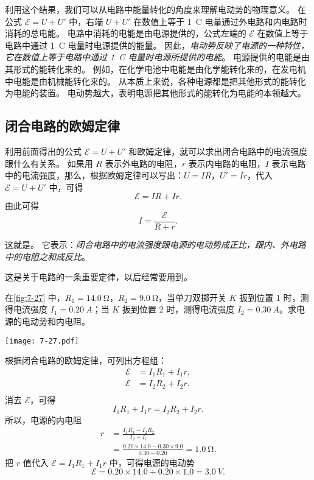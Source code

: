 利用这个结果，我们可以从电路中能量转化的角度来理解电动势的物理意义。
在公式 $\mathcal{E}=U+U'$ 中，右端 $U+U'$ 在数值上等于 \qty{1}{C} 电量通过外电路和内电路时消耗的总电能。
电路中消耗的电能是由电源提供的，公式左端的 $\mathcal{E}$ 在数值上等于电路中通过 \qty{1}{C} 电量时电源提供的能量。
因此，\emph{电动势反映了电源的一种特性，它在数值上等于电路中通过 \qty{1}{C} 电量时电源所提供的电能}。
电源提供的电能是由其形式的能转化来的。
例如，在化学电池中电能是由化学能转化来的，在发电机中电能是由机械能转化来的。
从本质上来说，各种电源都是把其他形式的能转化为电能的装置。
电动势越大，表明电源把其他形式的能转化为电能的本领越大。

\subsection{闭合电路的欧姆定律}

利用前面得出的公式 $\mathcal{E}=U+U'$ 和欧姆定律，就可以求出闭合电路中的电流强度跟什么有关系。
如果用 $R$ 表示外电路的电阻，$r$ 表示内电路的电阻，$I$ 表示电路中的电流强度，那么，根据欧姆定律可以写出：$U=IR$，$U'=Ir$，代入$\mathcal{E}=U+U'$ 中，可得
\[\mathcal{E}=IR+Ir.\]
由此可得
\[I=\frac{\mathcal{E}}{R+r}.\]

这就是。
它表示：\emph{闭合电路中的电流强度跟电源的电动势成正比，跟内、外电路中的电阻之和成反比}。

这是关于电路的一条重要定律，以后经常要用到。

\medskip\noindent
\begin{minipage}{0.55\linewidth}
\begin{example}
在\cref{fig:7-27} 中，$R_1=\qty{14.0}{\ohm}$，$R_2=\qty{9.0}{\ohm}$，当单刀双掷开关 $K$ 扳到位置 1 时，测得电流强度 $I_1=\qty{0.20}{A}$；当 $K$ 扳到位置 2 时，测得电流强度 $I_2=\qty{0.30}{A}$。求电源的电动势和内电阻。
\end{example}
\end{minipage}\hfill
\begin{minipage}{0.4\linewidth}
\begin{figurehere}
  \texttt{[image: 7-27.pdf]}
  \caption{}\label{fig:7-27}
\end{figurehere}
\end{minipage}	

\medskip
\begin{solution}
根据闭合电路的欧姆定律，可列出方程组：
\[\begin{split}
    \mathcal{E}&=I_1R_1+I_1r,\\
    \mathcal{E}&=I_2R_2+I_2r.\\
\end{split}\]
消去 $\mathcal{E}$，可得
\[I_1 R_1+I_1r=I_2R_2+I_2r.\]
所以，电源的内电阻
\[\begin{split}
r&=\frac{I_1R_1-I_2R_2}{I_2-I_1}\\
&=\frac{0.20\times 14.0-0.30\times 9.0}{0.30-0.20}=\qty{1.0}{\ohm}.
\end{split}\]
把 $r$ 值代入 $\mathcal{E}=I_1R_1+I_1r$ 中，可得电源的电动势
\[\mathcal{E}=0.20\times 14.0+0.20\times 1.0=\qty{3.0}{V}.\]
\end{solution}

